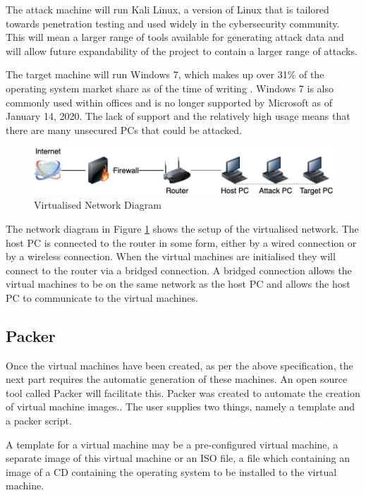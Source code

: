 The attack machine will run Kali Linux, a version of Linux that is tailored towards penetration testing and used widely in the cybersecurity community. This will mean a larger range of tools available for generating attack data and will allow future expandability of the project to contain a larger range of attacks. 

The target machine will run Windows 7, which makes up over 31\% of the operating system market share as of the time of writing \cite{osms}. Windows 7 is also commonly used within offices and is no longer supported by Microsoft as of January 14, 2020. The lack of support and the relatively high usage means that there are many unsecured PCs that could be attacked.

\begin{figure}[h]
 \centering
 \includegraphics[scale = 0.45]{Images/VM_Network.png}
 \caption{Virtualised Network Diagram }
 \label{fig:vnd}
\end{figure}

The network diagram in Figure \ref{fig:vnd} shows the setup of the virtualised network. The host PC is connected to the router in some form, either by a wired connection or by a wireless connection. When the virtual machines are initialised they will connect to the router via a bridged connection. A bridged connection allows the virtual machines to be on the same network as the host PC and allows the host PC to communicate to the virtual machines.

\subsection{Packer}
Once the virtual machines have been created, as per the above specification, the next part requires the automatic generation of these machines. An open source tool called Packer will facilitate this. Packer was created to automate the creation of virtual machine images.\cite{pckr}. The user supplies two things, namely a template and a packer script.

A template for a virtual machine may be a pre-configured virtual machine, a separate image of this virtual machine or an ISO file, a file which containing an image of a CD containing the operating system to be installed to the virtual machine. 

